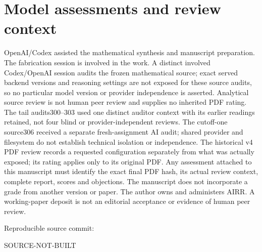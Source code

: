 \documentclass[11pt]{article}
\providecommand{\SourceCommit}{SOURCE-NOT-BUILT}
\begin{document}
\section*{Model assessments and review context}
OpenAI/Codex assisted the mathematical synthesis and manuscript preparation.
The fabrication session is involved in the work. A distinct involved
Codex/OpenAI session audits the frozen mathematical source; exact served
backend versions and reasoning settings are not exposed for these source
audits, so no particular
model version or provider independence is asserted. Analytical source
review is not human peer review and supplies no inherited PDF rating.
The tail audits300--303 used one distinct auditor context with its earlier
readings retained, not four blind or provider-independent reviews. The
cutoff-one source306 received a separate fresh-assignment AI audit;
shared provider and filesystem do not establish technical isolation or
independence. The
historical v4 PDF review records a requested configuration separately from
what was actually exposed; its rating applies only to its original PDF.
Any assessment attached to this manuscript must identify the exact final
PDF hash, its actual review context, complete report, scores and objections.
The manuscript does not incorporate a grade from another version or paper.
The author owns and administers AIRR. A working-paper deposit is not an
editorial acceptance or evidence of human peer review.

\smallskip\noindent
Reproducible source commit:\par\noindent
{\small\ttfamily\SourceCommit}
\end{document}
